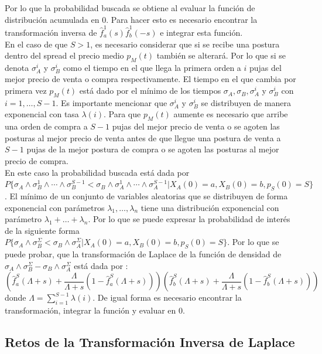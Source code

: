 \documentclass[11pt]{article}
\numberwithin{equation}{section} %
\begin{document}
Por lo que la probabilidad buscada se obtiene al evaluar la función de distribución acumulada en 0. Para hacer esto es necesario encontrar la transformación inversa de $\hat{f}_a^1(s)\hat{f}_b^1(-s)$ e integrar esta función.\\

En el caso de que $S>1$, es necesario considerar que si se recibe una postura dentro del spread el precio medio $p_M(t)$ también se alterará. Por lo que si se denota $\sigma_A^i$ y $\sigma_B^i$ como el tiempo en el que llega la primera orden a $i$ pujas del mejor precio de venta o compra respectivamente. El tiempo en el que cambia por primera vez $p_M(t)$ está dado por el mínimo de los tiempos $\sigma_A,\sigma_B,\sigma_A^i$ y $\sigma_B^i$ con $i=1,\ldots,S-1$. Es importante mencionar que $\sigma_A^i$ y $\sigma_B^i$ se distribuyen de manera exponencial con tasa $\lambda(i)$. Para que $p_M(t)$ aumente es necesario que arribe una orden de compra a $S-1$ pujas del mejor precio de venta o se agoten las posturas al mejor precio de venta antes de que llegue una postura de venta a $S-1$ pujas de la mejor postura de compra o se agoten las posturas al mejor precio de compra.\\

En este caso la probabilidad buscada está dada por $P\{\sigma_A \land \sigma_B^1 \land \cdots \land \sigma_B^{S-1} < \sigma_B \land \sigma_A^1 \land \cdots \land \sigma_A^{S-1}|X_A(0)=a,X_B(0)=b,p_S(0)=S\}$. El mínimo de un conjunto de variables aleatorias que se distribuyen de forma exponencial con parámetros $\lambda_1,\ldots,\lambda_n$ tiene una distribución exponencial con parámetro $\lambda_1+\ldots+\lambda_n$. Por lo que se puede expresar la probabilidad de interés de la siguiente forma $P\{\sigma_A \land \sigma_B^\Sigma < \sigma_B \land \sigma_A^\Sigma|X_A(0)=a,X_B(0)=b,p_S(0)=S\}$. Por lo que se puede probar, que la transformación de Laplace de la función de densidad de $\sigma_A \land \sigma_B^\Sigma - \sigma_B \land \sigma_A^\Sigma$ está dada por \cite{Cont2010}:
\[
\left(\hat{f}_a^S(\Lambda+s)+\frac{\Lambda}{\Lambda+s}(1-\hat{f}_a^S(\Lambda+s))\right)
\left(\hat{f}_b^S(\Lambda+s)+\frac{\Lambda}{\Lambda+s}(1-\hat{f}_b^S(\Lambda+s))\right)
\]
donde $\Lambda=\sum_{i=1}^{S-1}\lambda(i)$. De igual forma es necesario encontrar la transformación, integrar la función y evaluar en 0.\\

\subsection{Retos de la Transformación Inversa de Laplace}
\label{sec:retos}
\end{document}
